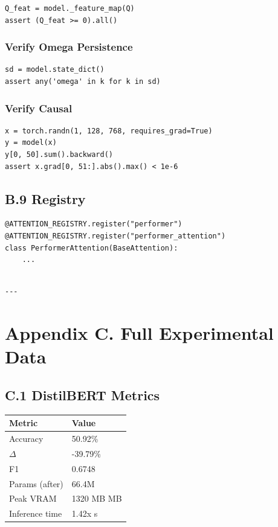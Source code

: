 \begin{lstlisting}
Q_feat = model._feature_map(Q)
assert (Q_feat >= 0).all()
\end{lstlisting}

\subsubsection{Verify Omega Persistence}

\begin{lstlisting}
sd = model.state_dict()
assert any('omega' in k for k in sd)
\end{lstlisting}

\subsubsection{Verify Causal}

\begin{lstlisting}
x = torch.randn(1, 128, 768, requires_grad=True)
y = model(x)
y[0, 50].sum().backward()
assert x.grad[0, 51:].abs().max() < 1e-6
\end{lstlisting}

\subsection{B.9 Registry}

\begin{lstlisting}
@ATTENTION_REGISTRY.register("performer")
@ATTENTION_REGISTRY.register("performer_attention")
class PerformerAttention(BaseAttention):
    ...
\end{lstlisting}
\begin{lstlisting}

---
\end{lstlisting}


\section{Appendix C. Full Experimental Data}

\subsection{C.1 DistilBERT Metrics}

\begin{table}[H]
\centering
\small
\begin{tabular}{ll}
\toprule
\textbf{Metric} & \textbf{Value} \\
\midrule
Accuracy & 50.92\% \\
$\Delta$ & -39.79\% \\
F1 & 0.6748 \\
Params (after) & 66.4M \\
Peak VRAM & 1320 MB MB \\
Inference time & 1.42x s \\
\bottomrule
\end{tabular}
\end{table}

